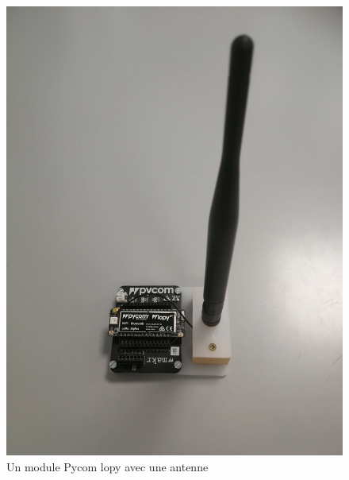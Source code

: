 \begin{figure}[h]
\centering

\includegraphics[scale=0.08]{images/lopy.png}
\caption{Un module Pycom lopy avec une antenne}\label{term35}
\end{figure}

